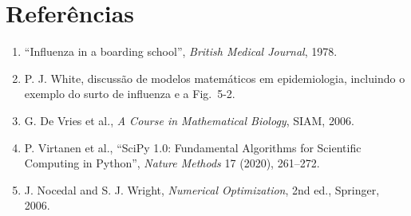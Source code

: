 \documentclass[12pt]{article}
\begin{document}
\section{Referências}
\begin{enumerate}
\item ``Influenza in a boarding school'', \emph{British Medical Journal}, 1978.
\item P. J. White, discussão de modelos matemáticos em epidemiologia, incluindo o exemplo do surto de influenza e a Fig.~5-2.
\item G. De Vries et al., \emph{A Course in Mathematical Biology}, SIAM, 2006.
\item P. Virtanen et al., ``SciPy 1.0: Fundamental Algorithms for Scientific Computing in Python'', \emph{Nature Methods} 17 (2020), 261--272.
\item J. Nocedal and S. J. Wright, \emph{Numerical Optimization}, 2nd ed., Springer, 2006.
\end{enumerate}
\end{document}
